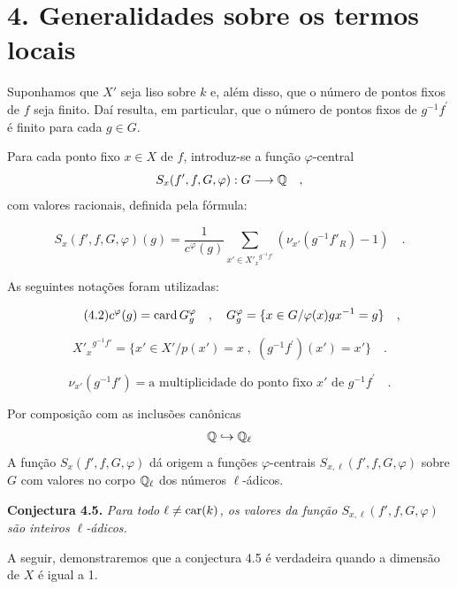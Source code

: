 \section*{4. Generalidades sobre os termos locais}

Suponhamos que $X'$ seja liso sobre $k$ e, além disso, que o número de pontos fixos de $f$ seja finito. Daí resulta, em particular, que o número de pontos fixos de $g^{-1}f^{\prime}$ é finito para cada $g \in G$.

Para cada ponto fixo $x \in X$ de $f$, introduz-se a função $\varphi$-central
\[
S_x(f',f,G,\varphi) : G \longrightarrow \mathbb Q \quad ,
\]
com valores racionais, definida pela fórmula:

\begin{equation}\tag{4.1}
S_x(f',f,G,\varphi)(g) = \frac{1}{c^\varphi(g)} \sum_{x' \in {X'_x}^{g^{-1}f'}} (\nu_{x'}(g^{-1}f'_R) - 1) \quad .
\end{equation}

As seguintes notações foram utilizadas:

\begin{equation}\tag{4.2}
c^\varphi(g) = \operatorname{card} G_g^\varphi \quad , \quad G_g^\varphi = \{ x \in G / \varphi(x)gx^{-1} = g \} \quad ,
\end{equation}

\begin{equation}\tag{4.3}
{X'_x}^{g^{-1}f'} = \{ x' \in X' / p(x') = x \; , \; (g^{-1}f^{\prime})(x') = x' \} \quad .
\end{equation}

\begin{equation}\tag{4.4}
\nu_{x'}(g^{-1}f') = \text{a multiplicidade do ponto fixo } x' \text{ de } g^{-1}f^{\prime} \quad .
\end{equation}

Por composição com as inclusões canônicas
\[
\mathbb Q \hookrightarrow \mathbb Q_\ell
\]
A função $S_x(f',f,G,\varphi)$ dá origem a funções $\varphi$-centrais $S_{x,\ell}(f',f,G,\varphi)$ sobre $G$ com valores no corpo $\mathbb Q_\ell$ dos números $\ell$-ádicos.

\medskip
\noindent
\textbf{Conjectura 4.5.} \emph{Para todo $\ell \neq \operatorname{car}(k)$, os valores da função $S_{x,\ell}(f',f,G,\varphi)$ são inteiros $\ell$-ádicos.}

\medskip

A seguir, demonstraremos que a conjectura 4.5 é verdadeira quando a dimensão de $X$ é igual a 1.
